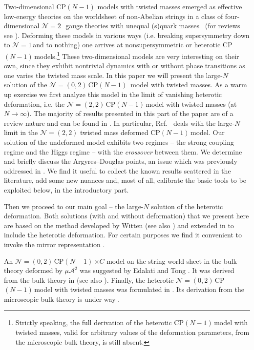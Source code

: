 \documentclass[epsfig,12pt]{article}
\newcommand{\ntwo}{${\mathcal N}=2\,$}
\newcommand{\none}{${\mathcal N}=1\,$}
\newcommand{\ntt}{${\mathcal N}=(2,2)\,$}
\newcommand{\nzt}{${\mathcal N}=(0,2)\,$}
\newcommand{\cpn}{CP$(N-1)\,$}
\newcommand{\ca}{{\mathcal A}}
\newcommand{\ntwot}{${\mathcal N}= \left(2,2\right) $ }
\begin{document}
Two-dimensional  CP$(N-1)$ models with twisted masses
emerged as effective low-energy theories on
the worldsheet of non-Abelian strings in a class of 
four-dimensional \ntwo\, gauge theories with unequal (s)quark 
masses~\cite{HT1,ABEKY,SYmon,HT2} (for reviews see  \cite{Trev}). 
Deforming these models in various ways (i.e. breaking supersymmetry down to \none and to nothing)
one arrives at nonsupersymmetric or heterotic \cpn models.\footnote{
Strictly speaking, the full derivation of the
heterotic \cpn model with twisted masses, valid for arbitrary values of
the deformation parameters,  from the microscopic bulk theory, is still absent.} These two-dimensional models are very 
interesting on their own, since they exhibit nontrivial dynamics with or without phase transitions 
as one varies the twisted mass scale.
In this paper we will present the large-$N$ solution of the \nzt \mbox{\cpn}  model with twisted
masses. As a warm up exercise
we first analyze this model in the limit of vanishing heterotic deformation,
i.e. the \ntt \cpn model with twisted masses (at $N\to\infty$). The majority of results presented
in this part of the paper are of a review nature
and  can be found in  \cite{HaHo,Dor,MR1,Ferrari}. In particular, Ref.~\cite{Ferrari}
deals with the large-$N$ limit in the \ntwot twisted mass deformed \cpn model.
Our solution  of the undeformed model exhibits two regimes -- the strong coupling regime and 
the Higgs regime -- with the {\em crossover} between them. We determine and briefly discuss the
Argyres--Douglas points, an issue which was  previously addressed in \cite{Ferrari,Tadpoint}.
We find it useful to collect the known results scattered in the literature, add some new nuances and, most of all,
calibrate the basic tools to be exploited below, in the introductory part.

Then we proceed to our main goal -- the large-$N$ solution of the heterotic deformation.
 Both solutions (with and without deformation)
that we present here are based on the method developed by Witten
\cite{W79,W93} (see also \cite{dadvl}) and extended in \cite{SYhet} to include the heterotic deformation.
For certain purposes we find it convenient to invoke the mirror
representation \cite{MR1,MR2}. 

An \nzt \cpn$\times C$
model on the string world sheet in the bulk theory deformed by $\mu\ca^2$
was suggested by Edalati and Tong \cite{EdTo}.
It was derived from the bulk theory in \cite{SY1} (see also \cite{BSY1,BSY2}).
Finally, the heterotic \nzt  \cpn model with twisted masses was formulated in \cite{BSY3}.
Its derivation from the microscopic bulk theory is under way \cite{underway}.
\end{document}
